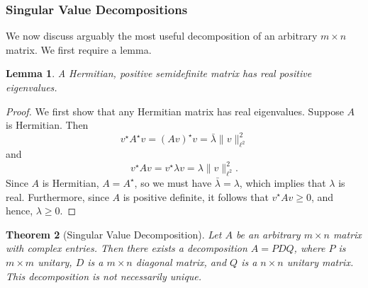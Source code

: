 \documentclass[12pt]{article}
\theoremstyle{plain}
\newtheorem{theorem}{Theorem}
\newtheorem{lemma}[theorem]{Lemma}
\theoremstyle{definition}
\theoremstyle{remark}
\numberwithin{equation}{section}  %
\begin{document}
\subsubsection*{Singular Value Decompositions}
We now discuss arguably the most useful decomposition of an arbitrary $m \times
n$ matrix. We first require a lemma.
\begin{lemma}
	\label{lem:hermite}
	A Hermitian, positive semidefinite matrix has real positive eigenvalues.
\end{lemma}
\begin{proof}
	We first show that any Hermitian matrix has real eigenvalues. Suppose $A$ is Hermitian.
	Then
	\begin{equation*}
		v^{\star} A^{\star} v = (A v)^{\star} v = \bar{\lambda} \| v \|_{\ell^2}^{2}
	\end{equation*}
	and
	\begin{equation*}
		v^{\star} A v = v^{\star} \lambda v =  \lambda \| v \|_{\ell^2}^{2}.
	\end{equation*}
	Since $A$ is Hermitian, $A = A^{\star}$, so we must have $\bar{\lambda} =
	\lambda$, which implies that $\lambda$ is real. Furthermore, since $A$ is
	positive definite, it follows that $v^\star A v \ge 0$, and hence,
	$\lambda \ge 0$.
\end{proof}
\begin{theorem}[Singular Value Decomposition]
	Let $A$ be an arbitrary $m \times n$ matrix with complex entries.
	Then there exists a decomposition $A = PDQ$, where $P$ is $m \times m$ unitary,
	$D$ is a $m \times n$ diagonal matrix, and $Q$ is a $n \times n$ unitary matrix.
	This decomposition is not necessarily unique.
\end{theorem} 
\end{document}

